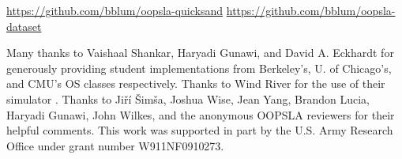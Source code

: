 \documentclass[10pt,times,numbers]{sigplanconf}
\begin{document}
\url{https://github.com/bblum/oopsla-quicksand}
\url{https://github.com/bblum/oopsla-dataset}





%

\acks

Many thanks to Vaishaal Shankar, Haryadi Gunawi, and David A. Eckhardt for generously providing student implementations from Berkeley's, U. of Chicago's, and CMU's OS classes respectively.
Thanks to Wind River for the use of their simulator \simics.
Thanks to
Ji\v{r}\'{i} \v{S}im\v{s}a, Joshua Wise, Jean Yang, Brandon Lucia, Haryadi Gunawi, John Wilkes, and
the anonymous OOPSLA reviewers for their helpful comments.
This work was supported in part by
the U.S. Army Research Office under grant number W911NF0910273.



{}
\end{document}
